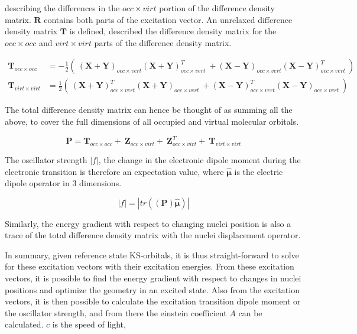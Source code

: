 \documentclass[11pt]{article}
\begin{document}
describing the differences in the $ occ \times virt $ portion of
the difference density matrix. $\mathbf{R}$ contains both parts
of the excitation vector. An unrelaxed difference density matrix
$\mathbf{T}$ is defined, described the difference density matrix
for the  $occ \times occ$  and $virt \times virt$ parts of
the difference density matrix.

\begin{align}
  \label{eq:tEquation}
  \mathbf{T}_{occ\times occ} &= -\frac{1}{2}(\
  \mathbf{(X+Y)}_{occ\times vert}\mathbf{(X+Y)}^T_{occ\times vert}\ 
 +\mathbf{(X-Y)}_{occ\times vert}\mathbf{(X-Y)}^T_{occ\times vert}\ 
  )\\
  \mathbf{T}_{virt\times virt} &= \frac{1}{2}(\
  \mathbf{(X+Y)}^T_{occ\times vert}\mathbf{(X+Y)}_{occ\times vert}\ 
 +\mathbf{(X-Y)}^T_{occ\times vert}\mathbf{(X-Y)}_{occ\times vert}\ 
  )
\end{align}

The total difference density matrix can hence be thought of as
summing all the above, to cover the full dimensions of all
occupied and virtual molecular orbitals.

\begin{equation}
   \label{eq:pEquation}
   \mathbf{P} = \mathbf{T}_{occ \times occ} +\
                \mathbf{Z}_{occ \times virt} +\
                \mathbf{Z}^T_{occ \times virt} +\
                \mathbf{T}_{virt \times virt}
\end{equation}

The oscillator strength $|f|$, the change in the electronic dipole
moment during the electronic transition is therefore an
expectation value, where $\hat{\mathbf{\mu}}$ is the electric dipole
operator in 3 dimensions. 

\begin{equation}
\label{eq:oscilStrength}
|f|=|tr((\mathbf{P})\hat{\mathbf{\mu}})|
\end{equation}

Similarly, the energy gradient with respect to changing nuclei
position is also a trace of the total difference density matrix
with the nuclei displacement operator.

In summary, given reference state KS-orbitals, it is thus straight-forward
to solve for these excitation vectors with their
excitation energies.  From these excitation vectors, it
is possible to find the energy gradient with respect to
changes in nuclei positions and optimize the geometry
in an excited state. Also from the excitation vectors, it is then
possible to calculate the excitation transition dipole moment
or the oscillator strength, and from there the einstein
coefficient $A$ can be calculated. $ c $ is the speed of light,
\end{document}

